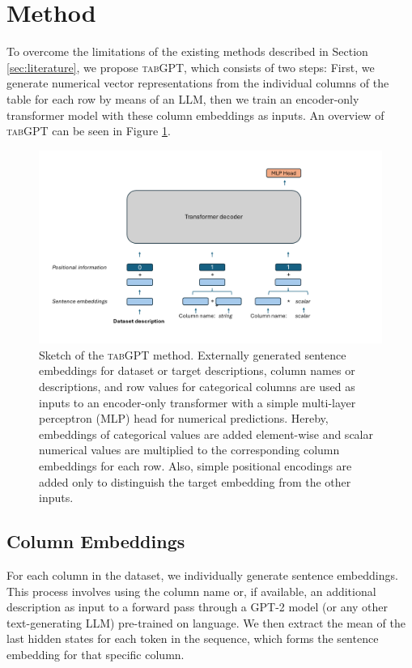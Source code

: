 \documentclass{article}
\begin{document}
\section{Method}
\label{sec:method}

To overcome the limitations of the existing methods described in Section \ref{sec:literature}, we propose \textsc{tabGPT}, which consists of two steps: First, we generate numerical vector representations from the individual columns of the table for each row by means of an LLM, then we train an encoder-only transformer model with these column embeddings as inputs. An overview of \textsc{tabGPT} can be seen in Figure \ref{fig:tabGPT}.

\begin{figure}[ht]
    \centering
    \includegraphics[width=0.95\linewidth]{tabgpt.png}
    \caption{Sketch of the \textsc{tabGPT} method. Externally generated sentence embeddings for dataset or target descriptions, column names or descriptions, and row values for categorical columns are used as inputs to an encoder-only transformer with a simple multi-layer perceptron (MLP) head for numerical predictions. Hereby, embeddings of categorical values are added element-wise and scalar numerical values are multiplied to the corresponding column embeddings for each row. Also, simple positional encodings are added only to distinguish the target embedding from the other inputs.}
    \label{fig:tabGPT}
\end{figure}

\subsection{Column Embeddings}
For each column in the dataset, we individually generate sentence embeddings. This process involves using the column name or, if available, an additional description as input to a forward pass through a \textsc{GPT-2} model (or any other text-generating LLM) pre-trained on language. We then extract the mean of the last hidden states for each token in the sequence, which forms the sentence embedding for that specific column.
\end{document}
